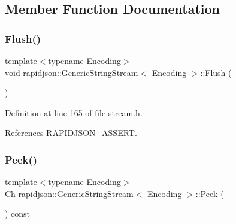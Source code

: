 \subsection{Member Function Documentation}
\mbox{\label{structrapidjson_1_1_generic_string_stream_a5c7a3e097eb461b9cec5976576ecb9e4}} 
\subsubsection{\texorpdfstring{Flush()}{Flush()}}
{\footnotesize\ttfamily template$<$typename Encoding$>$ \\
void \mbox{\hyperlink{structrapidjson_1_1_generic_string_stream}{rapidjson\+::\+Generic\+String\+Stream}}$<$ \mbox{\hyperlink{classrapidjson_1_1_encoding}{Encoding}} $>$\+::Flush (\begin{DoxyParamCaption}{ }\end{DoxyParamCaption})}



Definition at line 165 of file stream.\+h.


\begin{DoxyCode}{0}

\end{DoxyCode}


References R\+A\+P\+I\+D\+J\+S\+O\+N\+\_\+\+A\+S\+S\+E\+RT.

\mbox{\label{structrapidjson_1_1_generic_string_stream_aa941b18ff3849494ca3692a8688500da}} 
\subsubsection{\texorpdfstring{Peek()}{Peek()}}
{\footnotesize\ttfamily template$<$typename Encoding$>$ \\
\mbox{\hyperlink{structrapidjson_1_1_generic_string_stream_a70ad06c96ddf8349be59f3d4f6bbadc8}{Ch}} \mbox{\hyperlink{structrapidjson_1_1_generic_string_stream}{rapidjson\+::\+Generic\+String\+Stream}}$<$ \mbox{\hyperlink{classrapidjson_1_1_encoding}{Encoding}} $>$\+::Peek (\begin{DoxyParamCaption}{ }\end{DoxyParamCaption}) const}



